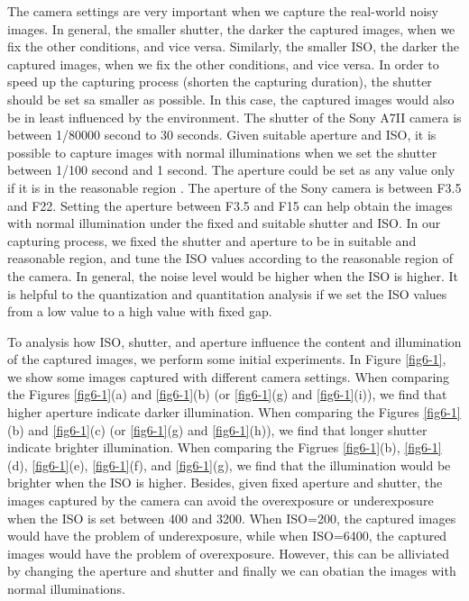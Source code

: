 The camera settings are very important when we capture the real-world noisy images. In general, the smaller shutter, the darker the captured images, when we fix the other conditions, and vice versa. Similarly, the smaller ISO, the darker the captured images, when we fix the other conditions, and vice versa. In order to speed up the capturing process (shorten the capturing duration), the shutter should be set sa smaller as possible. In this case, the captured images would also be in least influenced by the environment. The shutter of the Sony A7II camera is between 1/80000 second to 30 seconds. Given suitable aperture and ISO, it is possible to capture images with normal illuminations when we set the shutter between 1/100 second and 1 second. The aperture could be set as any value only if it is in the reasonable region . The aperture of the Sony camera is between F3.5 and F22. Setting the aperture between F3.5 and F15 can help obtain the images with normal illumination under the fixed and suitable shutter and ISO. In our capturing process, we fixed the shutter and aperture to be in suitable and reasonable region, and tune the ISO values according to the reasonable region of the camera. In general, the noise level would be higher when the ISO is higher. It is helpful to the quantization and quantitation analysis if we set the ISO values from a low value to a high value with fixed gap.

To analysis how ISO, shutter, and aperture influence the content and illumination of the captured images, we perform some initial experiments. In Figure \ref{fig6-1}, we show some images captured with different camera settings. When comparing the Figures \ref{fig6-1}(a) and \ref{fig6-1}(b) (or \ref{fig6-1}(g) and \ref{fig6-1}(i)), we find that higher aperture indicate darker illumination. When comparing the Figures \ref{fig6-1}(b) and \ref{fig6-1}(c) (or \ref{fig6-1}(g) and \ref{fig6-1}(h)), we find that longer shutter indicate brighter illumination. When comparing the Figrues \ref{fig6-1}(b), \ref{fig6-1}(d), \ref{fig6-1}(e), \ref{fig6-1}(f), and \ref{fig6-1}(g), we find that the illumination would be brighter when the ISO is higher. Besides, given fixed aperture and shutter, the images captured by the camera can avoid the overexposure or underexposure when the ISO is set between 400 and 3200.  When ISO=200, the captured images would have the problem of underexposure, while when ISO=6400, the captured images would have the problem of overexposure. However, this can be alliviated by changing the aperture and shutter and finally we can obatian the images with normal illuminations.

